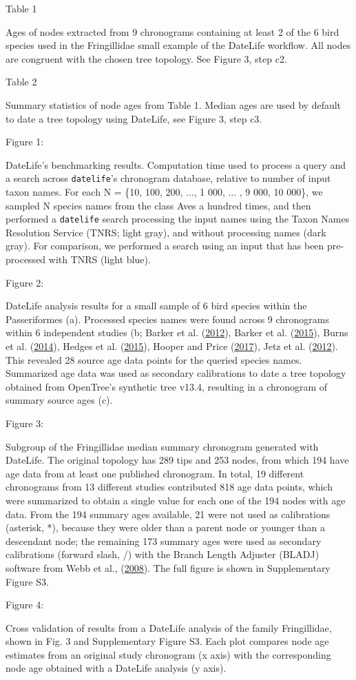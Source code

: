 Table 1

Ages of nodes extracted from 9 chronograms containing at least 2 of the 6 bird species used in the Fringillidae small example of the DateLife workflow. All nodes are congruent with the chosen tree topology. See Figure 3, step c2.

Table 2

Summary statistics of node ages from Table 1. Median ages are used by default to date a tree topology using DateLife, see Figure 3, step c3.

Figure 1:

DateLife's benchmarking results. Computation time used to process a query and a search across \texttt{datelife}'s chronogram database, relative to number of input taxon names. For each N = \{10, 100, 200, ..., 1 000, ... , 9 000, 10 000\}, we sampled N species names from the class Aves a hundred times, and then performed a \texttt{datelife} search processing the input names using the Taxon Names Resolution Service (TNRS; light gray), and without processing names (dark gray). For comparison, we performed a search using an input that has been pre-processed with TNRS (light blue).

Figure 2:

DateLife analysis results for a small sample of 6 bird species within the Passeriformes (a). Processed species names were found across 9 chronograms within 6 independent studies (b; Barker et al. (\protect\hyperlink{ref-barker2012going}{2012}), Barker et al. (\protect\hyperlink{ref-barker2015new}{2015}), Burns et al. (\protect\hyperlink{ref-burns2014phylogenetics}{2014}), Hedges et al. (\protect\hyperlink{ref-Hedges2015}{2015}), Hooper and Price (\protect\hyperlink{ref-hooper2017chromosomal}{2017}), Jetz et al. (\protect\hyperlink{ref-Jetz2012}{2012}). This revealed 28 source age data points for the queried species names. Summarized age data was used as secondary calibrations to date a tree topology obtained from OpenTree's synthetic tree v13.4, resulting in a chronogram of summary source ages (c).




Figure 3:

Subgroup of the Fringillidae median summary chronogram generated with DateLife. The original topology has 289 tips and 253 nodes, from which 194 have age data from at least one published chronogram. In total, 19 different chronograms from 13 different studies contributed 818 age data points, which were summarized to obtain a single value for each one of the 194 nodes with age data. From the 194 summary ages available, 21 were not used as calibrations (asterisk, *), because they were older than a parent node or younger than a descendant node; the remaining 173 summary ages were used as secondary calibrations (forward slash, /) with the Branch Length Adjuster (BLADJ) software from Webb et al., (\protect\hyperlink{ref-Webb2008}{2008}). The full figure is shown in Supplementary Figure S3.



Figure 4:

Cross validation of results from a DateLife analysis of the family Fringillidae, shown in Fig. 3 and Supplementary Figure S3. Each plot compares node age estimates from an original study chronogram (x axis) with the corresponding node age obtained with a DateLife analysis (y axis).
